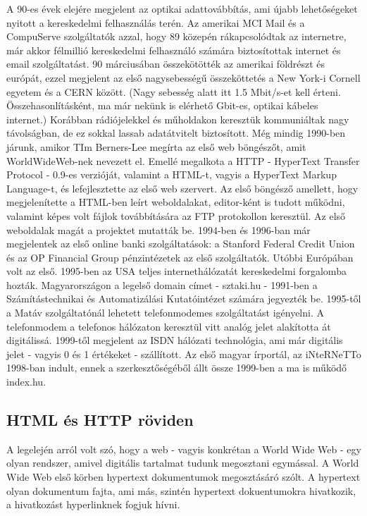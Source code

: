 \documentclass[a4paper, 12pt, oneside]{article}
\begin{document}
A 90-es évek elejére megjelent az optikai adattovábbítás, ami újabb lehetőségeket nyitott a kereskedelmi felhasználás terén. Az amerikai MCI Mail és a CompuServe szolgáltatók azzal, hogy 89 közepén rákapcsolódtak az internetre, már akkor félmillió kereskedelmi felhasználó számára biztosítottak internet és email szolgáltatást. 90 márciusában összekötötték az amerikai földrészt és európát, ezzel megjelent az első nagysebességű összeköttetés a New York-i Cornell egyetem és a CERN között. (Nagy sebesség alatt itt 1.5 Mbit/s-et kell érteni. Összehasonlításként, ma már nekünk is elérhető Gbit-es, optikai kábeles internet.) Korábban rádiójelekkel és műholdakon keresztük kommuniáltak nagy távolságban, de ez sokkal lassab adatátvitelt biztosított.
\bigbreak
Még mindig 1990-ben járunk, amikor TIm Berners-Lee megírta az első web böngészőt, amit WorldWideWeb-nek nevezett el. Emellé megalkota a HTTP - HyperText Transfer Protocol - 0.9-es verzióját, valamint a HTML-t, vagyis a HyperText Markup Language-t, és lefejlesztette az első web szervert. Az első böngésző amellett, hogy megjelenítette a HTML-ben leírt weboldalakat, editor-ként is tudott működni, valamint képes volt fájlok továbbítására az FTP protokollon keresztül. Az első weboldalak magát a projektet mutatták be. 1994-ben és 1996-ban már megjelentek az első online banki szolgáltatások: a Stanford Federal Credit Union és az OP Financial Group pénzintézetek az első szolgáltatók. Utóbbi Európában volt az első. 1995-ben az USA teljes internethálózatát kereskedelmi forgalomba hozták.
\bigbreak
Magyarországon a legelső domain címet - sztaki.hu - 1991-ben a Számítástechnikai és Automatizálási Kutatóintézet számára jegyezték be. 1995-től a Matáv szolgáltatónál lehetett telefonmodemes szolgáltatást igényelni. A telefonmodem a telefonos hálózaton keresztül vitt analóg jelet alakította át digitálissá. 1999-től megjelent az ISDN hálózati technológia, ami már digitális jelet - vagyis 0 és 1 értékeket - szállított. Az első magyar írportál, az iNteRNeTTo 1998-ban indult, ennek a szerkesztőségéből állt össze 1999-ben a ma is működő index.hu.

\subsection*{HTML és HTTP röviden}

A legelején arról volt szó, hogy a web - vagyis konkrétan a World Wide Web - egy olyan rendszer, amivel digitális tartalmat tudunk megosztani egymással. A World Wide Web első körben hypertext dokumentumok megosztásáró szólt. A hypertext olyan dokumentum fajta, ami más, szintén hypertext dokuentumokra hivatkozik, a hivatkozást hyperlinknek fogjuk hívni.
\end{document}
